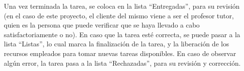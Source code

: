 Una vez terminada la tarea, se coloca en la lista ``Entregadas'', para su revisión (en el caso de este proyecto, el cliente del mismo viene a ser el profesor tutor, quien es la persona que puede verificar que se haya llevado a cabo satisfactoriamente o no). En caso que la tarea esté correcta, se puede pasar a la lista ``Listas'', lo cual marca la finalización de la tarea, y la liberación de los recursos empleados para tomar nuevas tareas disponibles. En caso de observar algún error, la tarea pasa a la lista ``Rechazadas'', para su revisión y corrección.
